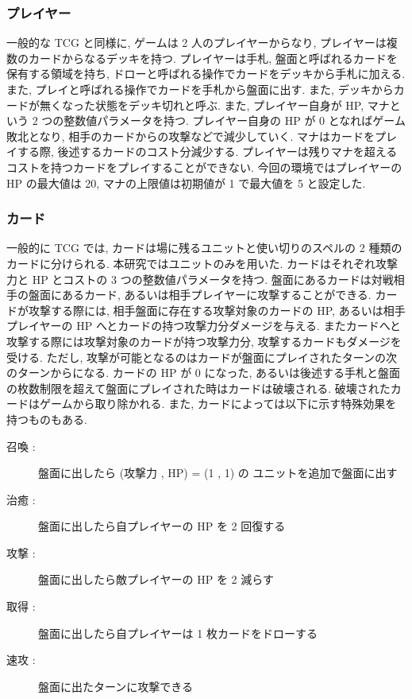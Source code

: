 \documentclass[12pt]{jarticle}
\begin{document}
\subsubsection{プレイヤー}
一般的な TCG と同様に, ゲームは 2 人のプレイヤーからなり, プレイヤーは複数のカードからなるデッキを持つ. 
プレイヤーは手札, 盤面と呼ばれるカードを保有する領域を持ち, ドローと呼ばれる操作でカードをデッキから手札に加える. また, プレイと呼ばれる操作でカードを手札から盤面に出す. また, デッキからカードが無くなった状態をデッキ切れと呼ぶ.  
また, プレイヤー自身が HP, マナという 2 つの整数値パラメータを持つ.
プレイヤー自身の HP が 0 となればゲーム敗北となり, 相手のカードからの攻撃などで減少していく.
マナはカードをプレイする際, 後述するカードのコスト分減少する. プレイヤーは残りマナを超えるコストを持つカードをプレイすることができない. 
今回の環境ではプレイヤーの HP の最大値は 20, マナの上限値は初期値が 1 で最大値を 5 と設定した.
\subsubsection{カード}
一般的に TCG では, カードは場に残るユニットと使い切りのスペルの 2 種類のカードに分けられる. 本研究ではユニットのみを用いた.
カードはそれぞれ攻撃力と HP とコストの 3 つの整数値パラメータを持つ.  盤面にあるカードは対戦相手の盤面にあるカード, あるいは相手プレイヤーに攻撃することができる. カードが攻撃する際には, 相手盤面に存在する攻撃対象のカードの HP, あるいは相手プレイヤーの HP へとカードの持つ攻撃力分ダメージを与える. またカードへと攻撃する際には攻撃対象のカードが持つ攻撃力分, 攻撃するカードもダメージを受ける.
ただし, 攻撃が可能となるのはカードが盤面にプレイされたターンの次のターンからになる. 
カードの HP が 0 になった, あるいは後述する手札と盤面の枚数制限を超えて盤面にプレイされた時はカードは破壊される. 破壊されたカードはゲームから取り除かれる. 
また, カードによっては以下に示す特殊効果を持つものもある.

\begin{description}
  \item[召喚 :]  盤面に出したら (攻撃力 , HP) = (1 , 1) の
  ユニットを追加で盤面に出す
  \item[治癒 :]  盤面に出したら自プレイヤーの HP を 2 回復する
  \item[攻撃 :]  盤面に出したら敵プレイヤーの HP を 2 減らす
  \item[取得 :]  盤面に出したら自プレイヤーは 1 枚カードをドローする
  \item[速攻 :]  盤面に出たターンに攻撃できる
\end{description}
\end{document}
